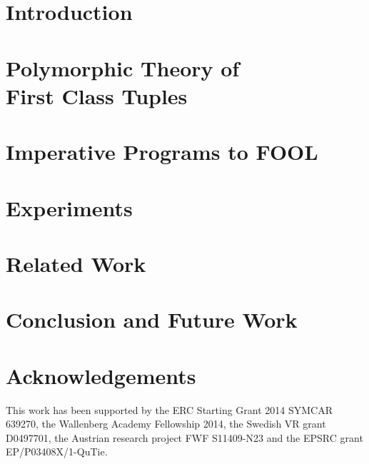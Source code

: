 




\section{Introduction}
\label{sec:boogie/introduction}


\section[Polymorphic Theory of First Class Tuples]{Polymorphic Theory of\\First Class Tuples}
\label{sec:boogie/tuples}


\section{Imperative Programs to FOOL}
\label{sec:boogie/technique}


\section{Experiments}
\label{sec:boogie/experiments}


\section{Related Work}
\label{sec:boogie/related}


\section{Conclusion and Future Work}
\label{sec:boogie/conclusions}


\section*{Acknowledgements}
This work has been supported by the ERC Starting Grant 2014 SYMCAR 639270, the Wallenberg Academy Fellowship 2014, the Swedish VR grant D0497701, the Austrian research project FWF S11409-N23 and the EPSRC grant EP/P03408X/1-QuTie.
